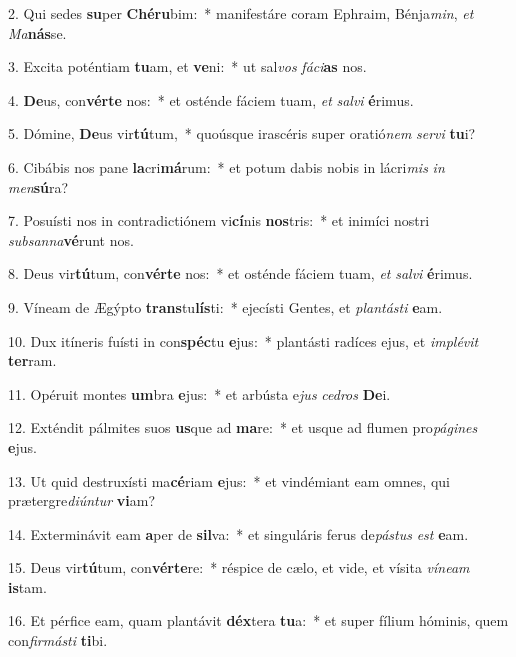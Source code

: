 2. Qui sedes \textbf{su}per \textbf{Ché}\textbf{ru}bim:~*  manifestáre coram Ephraim, Bénja\textit{min}, \textit{et} \textit{Ma}\textbf{nás}se.\

3. Excita poténtiam \textbf{tu}am, et \textbf{ve}ni:~*  ut sal\textit{vos} \textit{fá}\textit{ci}\textbf{as} nos.\

4. \textbf{De}us, con\textbf{vér}\textbf{te} nos:~*  et osténde fáciem tuam, \textit{et} \textit{sal}\textit{vi} \textbf{é}rimus.\

5. Dómine, \textbf{De}us vir\textbf{tú}tum,~*  quoúsque irascéris super oratió\textit{nem} \textit{ser}\textit{vi} \textbf{tu}i?\

6. Cibábis nos pane \textbf{la}cri\textbf{má}rum:~*  et potum dabis nobis in lácri\textit{mis} \textit{in} \textit{men}\textbf{sú}ra?\

7. Posuísti nos in contradictiónem vi\textbf{cí}nis \textbf{nos}tris:~*  et inimíci nostri \textit{sub}\textit{san}\textit{na}\textbf{vé}runt nos.\

8. Deus vir\textbf{tú}tum, con\textbf{vér}\textbf{te} nos:~*  et osténde fáciem tuam, \textit{et} \textit{sal}\textit{vi} \textbf{é}rimus.\

9. Víneam de Ægýpto \textbf{trans}tu\textbf{lís}ti:~*  ejecísti Gentes, et \textit{plan}\textit{tás}\textit{ti} \textbf{e}am.\

10. Dux itíneris fuísti in con\textbf{spéc}tu \textbf{e}jus:~*  plantásti radíces ejus, et \textit{im}\textit{plé}\textit{vit} \textbf{ter}ram.\

11. Opéruit montes \textbf{um}bra \textbf{e}jus:~*  et arbústa e\textit{jus} \textit{ce}\textit{dros} \textbf{De}i.\

12. Exténdit pálmites suos \textbf{us}que ad \textbf{ma}re:~*  et usque ad flumen pro\textit{pá}\textit{gi}\textit{nes} \textbf{e}jus.\

13. Ut quid destruxísti ma\textbf{cé}riam \textbf{e}jus:~*  et vindémiant eam omnes, qui prætergre\textit{di}\textit{ún}\textit{tur} \textbf{vi}am?\

14. Exterminávit eam \textbf{a}per de \textbf{sil}va:~*  et singuláris ferus de\textit{pás}\textit{tus} \textit{est} \textbf{e}am.\

15. Deus vir\textbf{tú}tum, con\textbf{vér}\textbf{te}re:~*  réspice de cælo, et vide, et vísita \textit{ví}\textit{ne}\textit{am} \textbf{is}tam.\

16. Et pérfice eam, quam plantávit \textbf{déx}tera \textbf{tu}a:~*  et super fílium hóminis, quem con\textit{fir}\textit{más}\textit{ti} \textbf{ti}bi.\

